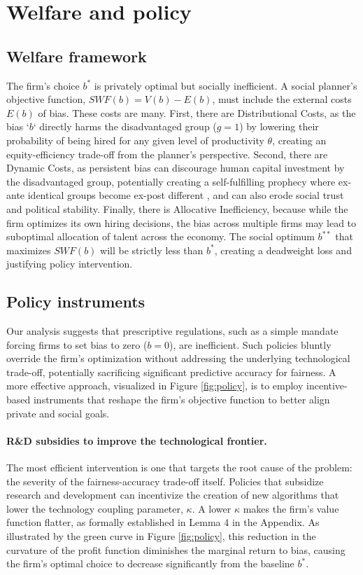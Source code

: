 \section{Welfare and policy}

\subsection{Welfare framework}
The firm's choice $b^*$ is privately optimal but socially inefficient. A social planner's objective function, $SWF(b) = V(b) - E(b)$, must include the external costs $E(b)$ of bias. These costs are many. First, there are Distributional Costs, as the bias `$b$` directly harms the disadvantaged group ($g=1$) by lowering their probability of being hired for any given level of productivity $\theta$, creating an equity-efficiency trade-off from the planner's perspective. Second, there are Dynamic Costs, as persistent bias can discourage human capital investment by the disadvantaged group, potentially creating a self-fulfilling prophecy where ex-ante identical groups become ex-post different \citep{Coate1993}, and can also erode social trust and political stability. Finally, there is Allocative Inefficiency, because while the firm optimizes its own hiring decisions, the bias across multiple firms may lead to suboptimal allocation of talent across the economy.
The social optimum $b^{**}$ that maximizes $SWF(b)$ will be strictly less than $b^*$, creating a deadweight loss and justifying policy intervention.

\subsection{Policy instruments}

Our analysis suggests that prescriptive regulations, such as a simple mandate forcing firms to set bias to zero ($b=0$), are inefficient. Such policies bluntly override the firm's optimization without addressing the underlying technological trade-off, potentially sacrificing significant predictive accuracy for fairness. A more effective approach, visualized in Figure \ref{fig:policy}, is to employ incentive-based instruments that reshape the firm's objective function to better align private and social goals.

\paragraph{R\&D subsidies to improve the technological frontier.}
The most efficient intervention is one that targets the root cause of the problem: the severity of the fairness-accuracy trade-off itself. Policies that subsidize research and development can incentivize the creation of new algorithms that lower the technology coupling parameter, $\kappa$. A lower $\kappa$ makes the firm's value function flatter, as formally established in Lemma 4 in the Appendix. As illustrated by the green curve in Figure \ref{fig:policy}, this reduction in the curvature of the profit function diminishes the marginal return to bias, causing the firm's optimal choice to decrease significantly from the baseline $b^*$.

